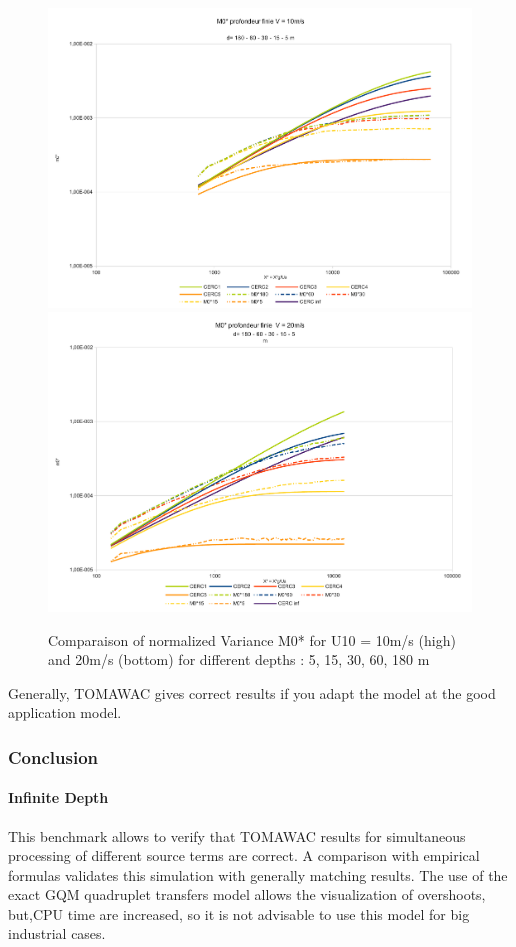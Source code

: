 \begin{figure}
\centering
\includegraphics[scale=0.4]{m0*_test7v10.pdf}\\
\includegraphics[scale=0.4]{m0*_test7v20.pdf}\\
\caption{Comparaison of normalized Variance M0* for U10 = 10m/s (high) and 20m/s (bottom) for different depths : 5, 15, 30, 60, 180 m}
\end{figure}
Generally, TOMAWAC gives correct results if you adapt the model at the good application model. 
\subsubsection{Conclusion}
\paragraph*{Infinite Depth}
This benchmark allows to verify that TOMAWAC results for simultaneous processing of different source terms are correct. A comparison with empirical formulas validates this simulation with generally matching results. The use of the exact GQM quadruplet transfers model allows the visualization of overshoots, but,CPU time are increased, so it is not advisable to use this model for big industrial cases.
